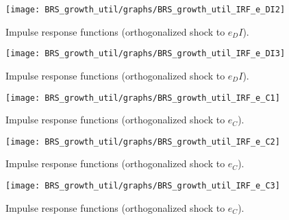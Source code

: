 \begin{figure}[H]
\centering 
\texttt{[image: BRS\_growth\_util/graphs/BRS\_growth\_util\_IRF\_e\_DI2]}
\caption{Impulse response functions (orthogonalized shock to ${e_DI}$).}\label{Fig:IRF:e_DI:2}
\end{figure}
 
\begin{figure}[H]
\centering 
\texttt{[image: BRS\_growth\_util/graphs/BRS\_growth\_util\_IRF\_e\_DI3]}
\caption{Impulse response functions (orthogonalized shock to ${e_DI}$).}\label{Fig:IRF:e_DI:3}
\end{figure}
 
\begin{figure}[H]
\centering 
\texttt{[image: BRS\_growth\_util/graphs/BRS\_growth\_util\_IRF\_e\_C1]}
\caption{Impulse response functions (orthogonalized shock to ${e_C}$).}\label{Fig:IRF:e_C:1}
\end{figure}
 
\begin{figure}[H]
\centering 
\texttt{[image: BRS\_growth\_util/graphs/BRS\_growth\_util\_IRF\_e\_C2]}
\caption{Impulse response functions (orthogonalized shock to ${e_C}$).}\label{Fig:IRF:e_C:2}
\end{figure}
 
\begin{figure}[H]
\centering 
\texttt{[image: BRS\_growth\_util/graphs/BRS\_growth\_util\_IRF\_e\_C3]}
\caption{Impulse response functions (orthogonalized shock to ${e_C}$).}\label{Fig:IRF:e_C:3}
\end{figure}
 
 
